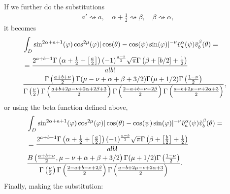 \documentclass{article}
\newcommand{\nobracket}{}
\begin{document}
\begin{answer}
  If we further do the substitutions
  \begin{eqnarray}
    & a' \rightsquigarrow a, \quad \alpha + \frac{1}{2} \rightsquigarrow
    \beta, \quad \beta \rightsquigarrow \alpha, &  \nonumber
  \end{eqnarray}
  it becomes
  \begin{eqnarray}
    & \int_D \sin^{2 \alpha + a + 1} (\varphi) \cos^{2 \mu} (\varphi) | \cos
    (\theta) - \cos (\psi) \sin (\varphi) |^{- \nu} \tilde{v}^{\alpha}_a
    (\psi) \tilde{v}^{\beta}_b (\theta) = \hspace*{\fill} &  \nonumber\\
    & = \frac{2^{a + b - 1} \Gamma \left( \alpha + \frac{1}{2} + \left[
    \frac{a}{2} \right] \right) (- 1)^{\frac{a - b}{2}} \sqrt{\pi} \Gamma
    \left( \beta + [b / 2] + \frac{1}{2} \right)}{a! b!} \nobracket \nobracket
    &  \nonumber\\
    & \frac{\Gamma \left( \frac{a + b + \nu}{2} \right) \Gamma (\mu - \nu +
    \alpha + \beta + 3 / 2) \Gamma (\mu + 1 / 2) \Gamma \left( \frac{1 -
    \nu}{2} \right)}{\Gamma \left( \frac{\nu}{2} \right) \Gamma \left( \frac{a
    + b + 2 \mu - \nu + 2 \alpha + 2 \beta + 3}{2} \right) \Gamma \left(
    \frac{2 - a + b - \nu + 2 \beta}{2} \right) \Gamma \left( \frac{a - b + 2
    \mu - \nu + 2 \alpha + 3}{2} \right)}, &  \nonumber
  \end{eqnarray}
  or using the beta function defined above,
  \begin{eqnarray}
    & \int_D \sin^{2 \alpha + a + 1} (\varphi) \cos^{2 \mu} (\varphi) | \cos
    (\theta) - \cos (\psi) \sin (\varphi) |^{- \nu} \tilde{v}^{\alpha}_a
    (\psi) \tilde{v}^{\beta}_b (\theta) = \hspace*{\fill} &  \nonumber\\
    & = \frac{2^{a + b - 1} \Gamma \left( \alpha + \frac{1}{2} + \left[
    \frac{a}{2} \right] \right) (- 1)^{\frac{a - b}{2}} \sqrt{\pi} \Gamma
    \left( \beta + \left[ \frac{b}{2} \right] + \frac{1}{2} \right)}{a! b!}
    \nobracket \nobracket &  \nonumber\\
    & \frac{B \left( \frac{a + b + \nu}{2}, \mu - \nu + \alpha + \beta + 3 /
    2 \right) \Gamma (\mu + 1 / 2) \Gamma \left( \frac{1 - \nu}{2}
    \right)}{\Gamma \left( \frac{\nu}{2} \right) \Gamma \left( \frac{2 - a + b
    - \nu + 2 \beta}{2} \right) \Gamma \left( \frac{a - b + 2 \mu - \nu + 2
    \alpha + 3}{2} \right)} . &  \nonumber
  \end{eqnarray}
  Finally, making the substitution:
  \begin{eqnarray}

\end{eqnarray}
\end{answer}
\end{document}
